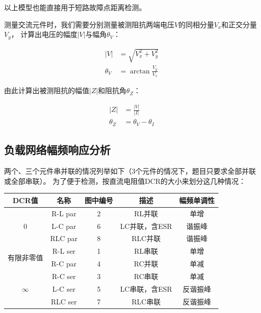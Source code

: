 以上模型也能直接用于短路故障点距离检测。

测量交流元件时，我们需要分别测量被测阻抗两端电压$V$的同相分量$V_x$和正交分量$V_y$，
计算出电压的幅度$|V|$与幅角$\theta_V$：

\begin{equation}
\begin{aligned}
  |V| &= \sqrt{V_x^2+V_y^2}\\
  \theta_V &= \arctan\frac{V_y}{V_x}
\end{aligned}
\end{equation}

由此计算出被测阻抗的幅值$|Z|$和阻抗角$\theta_Z$：

\begin{equation}
\begin{aligned}
  |Z| &= \frac{|V|}{|I|}\\
  \theta_Z &= \theta_V-\theta_I
\end{aligned}
\end{equation}

\subsection{负载网络幅频响应分析}
两个、三个元件串并联的情况列举如下（3个元件的情况下，题目只要求全部并联或全部串联）。
为了便于检测，按直流电阻值DCR的大小来划分这几种情况：

\begin{table}[H]
\center
\begin{tabular}{c|cccc}
    \hline
    DCR值 & 名称 & 图中编号 & 描述 & 幅频单调性\\
    \hline
    \multirow{3}{*}{0} & R-L par & 2 & RL并联 & 单增\\
                       & L-C par & 6 & LC并联，含ESR & 谐振峰\\
                       & RLC par & 8 & RLC并联 & 谐振峰\\
    \hline
    \multirow{2}{*}{有限非零值} & R-L ser & 1 & RL串联 & 单增\\
                              & R-C par & 4 & RC并联 & 单减\\
    \hline
    \multirow{3}{*}{$\infty$} & R-C ser & 3 & RC串联 & 单减\\
                              & L-C ser & 5 & LC串联，含ESR & 反谐振峰\\
                              & RLC ser & 7 & RLC串联 & 反谐振峰\\
    \hline
\end{tabular}
\end{table}

